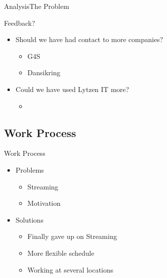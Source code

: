 \begin{frame}{Analysis}{The Problem}
    \begin{block}{Feedback?}
    \begin{itemize}
        \item Should we have had contact to more companies?
        \begin{itemize}
            \item G4S
            \item Dansikring
        \end{itemize}
        \item Could we have used Lytzen IT more?
        \begin{itemize}
            \item
        \end{itemize}
    \end{itemize}
    \end{block}
\end{frame}

\subsection{Work Process}
\begin{frame}{Work Process}
    \begin{itemize}
        \item Problems
        \begin{itemize}
            \item Streaming
            \item Motivation
        \end{itemize}
        \item Solutions
        \begin{itemize}
            \item Finally gave up on Streaming
            \item More flexible schedule
            \item Working at several locations
        \end{itemize}
    \end{itemize}
\end{frame}
